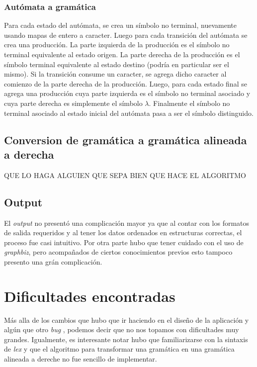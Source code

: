 \documentclass[a4paper,10pt]{article}
\begin{document}
\subsubsection{ Autómata a gramática }
           Para cada estado del autómata, se crea un símbolo no terminal, nuevamente usando mapas de entero a caracter. Luego para cada transición del 
autómata se crea una producción. La parte izquierda de la producción es el símbolo no terminal equivalente al estado origen. La parte derecha de 
la producción es el símbolo terminal equivalente al estado destino (podría en particular ser el mismo). Si la transición consume un caracter, 
se agrega dicho caracter al comienzo de la parte derecha de la producción. Luego, para cada estado final se agrega una producción cuya parte izquierda 
es el símbolo no terminal asociado y cuya parte derecha es simplemente el símbolo $\lambda$. Finalmente el símbolo no terminal asociado al estado inicial 
del autómata pasa a ser el símbolo distinguido.
 
      \subsection{Conversion de gramática a gramática alineada a derecha}
            QUE LO HAGA ALGUIEN QUE SEPA BIEN QUE HACE EL ALGORITMO
      \subsection{Output}
            El \textit{output} no presentó una complicación mayor ya que al contar con los formatos de salida 
            requeridos y al tener los datos ordenados en estructuras correctas, el proceso fue casi intuitivo.
            Por otra parte hubo que tener cuidado con el uso de \textit{graphbiz}, pero acompañados de ciertos
            conocimientos previos esto tampoco presento una grán complicación.

\newpage

\section{Dificultades encontradas}
    Más alla de los cambios que hubo que ir haciendo en el diseño de la aplicación y algún que otro \textit{bug} 
    , podemos decir que no nos topamos con dificultades muy grandes. Igualmente, es interesante notar hubo que 
    familiarizarse con la sintaxis de \textit{lex} y que el algoritmo para transformar una gramática en una 
    gramática alineada a dereche no fue sencillo de implementar.
\newpage
\end{document}
